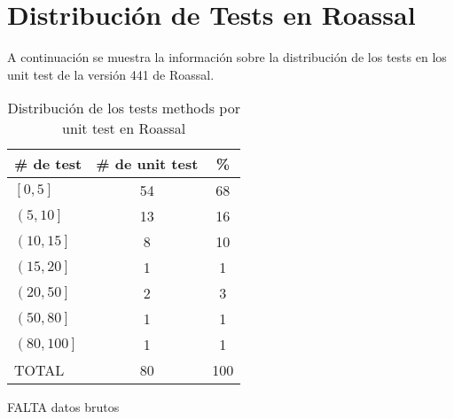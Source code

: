 
\chapter{Distribución de Tests en Roassal}

\par A continuación se muestra la información sobre la distribución de los tests en los unit test de la versión 441 de Roassal.

\begin{table}[h] 
    \centering 
    \begin{tabular}{|l|c|c|}
    	\hline
        \textbf{\# de test} & \textbf{\# de unit test} & \textbf{\%} \\ \hline\hline
        $\left[ 0,5 \right]$	& 54	&68 \\ \hline
		$\left( 5,10 \right]$	& 13	&16	\\ \hline
		$\left( 10,15 \right]$	& 8	&10	\\ \hline
		$\left( 15,20 \right]$	& 1	&1	\\ \hline
		$\left( 20,50 \right]$	& 2	&3	\\ \hline
		$\left( 50,80 \right]$	& 1	&1	\\ \hline
		$\left( 80,100 \right]$ & 1 &1	\\ 	\hline \hline
		TOTAL	& 80	&100	\\ \hline
    \end{tabular}
    \caption{Distribución de los tests methods por unit test en Roassal}
\end{table} 

\large FALTA datos brutos